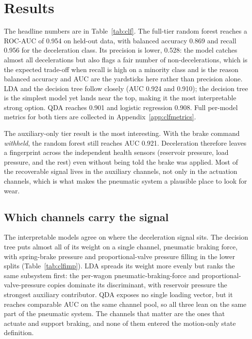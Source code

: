 \section{Results}

The headline numbers are in Table~\ref{tab:clf}. The full-tier random forest reaches a
ROC-AUC of 0.954 on held-out data, with balanced accuracy 0.869 and recall 0.956 for the
deceleration class. Its precision is lower, 0.528: the model catches almost all
decelerations but also flags a fair number of non-decelerations, which is the expected
trade-off when recall is high on a minority class and is the reason balanced accuracy and
AUC are the yardsticks here rather than precision alone. LDA and the decision tree follow
closely (AUC 0.924 and 0.910); the decision tree is the simplest model yet lands near the
top, making it the most interpretable strong option. QDA reaches 0.901 and logistic
regression 0.908. Full per-model metrics for both tiers are collected in
Appendix~\ref{app:clfmetrics}.

The auxiliary-only tier result is the most interesting. With the brake command \emph{withheld}, the
random forest still reaches AUC 0.921. Deceleration therefore leaves a fingerprint across
the independent health sensors (reservoir pressure, load pressure, and the rest) even
without being told the brake was applied. Most of the recoverable signal lives in the
auxiliary channels, not only in the actuation channels, which is what makes the pneumatic
system a plausible place to look for wear.

\subsection*{Which channels carry the signal}
\label{sec:clf-importance}

The interpretable models agree on where the deceleration signal sits. The decision tree
puts almost all of its weight on a single channel, pneumatic braking force, with spring-brake
pressure and proportional-valve pressure filling in the lower splits
(Table~\ref{tab:clfimp}). LDA spreads its weight more evenly but ranks the same subsystem
first: the per-wagon pneumatic-braking-force and proportional-valve-pressure copies dominate
its discriminant, with reservoir pressure the strongest auxiliary contributor. QDA exposes
no single loading vector, but it reaches comparable AUC on the same channel pool, so all
three lean on the same part of the pneumatic system. The channels that matter are the ones
that actuate and support braking, and none of them entered the motion-only state definition.


